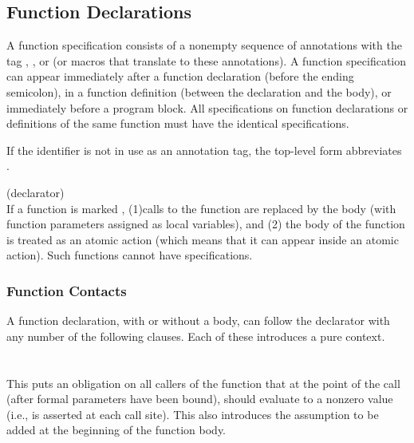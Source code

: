 \documentclass[preprint,nocopyrightspace]{sigplanconf}
\begin{document}
{{{\subsection{Function Declarations}
A function specification consists of a nonempty sequence of
annotations with the tag , ,
or  (or macros that translate to these annotations). A
function specification can appear immediately after a function
declaration (before the ending semicolon), in a function definition
(between the declaration and the body), or immediately before a
program block. All specifications on function declarations or
definitions of the same function must have the identical
specifications.

If the identifier  is not in use as an annotation tag, the
top-level form  abbreviates .

 (declarator)\\
If a function is marked , (1)calls to the
function are replaced by the body (with function parameters assigned
as local variables), and (2) the body of the function is treated as an
atomic action (which means that it can appear inside an atomic
action). Such functions cannot have specifications.

\subsubsection{Function Contacts}
A function declaration, with or without a body, can follow the
declarator with any number of the following clauses. Each of these
introduces a pure context.
\\\\
\\
This puts  an obligation on  all callers of  the function that  at the
point of the  call (after formal parameters have  been bound), 
should evaluate to a nonzero  value (i.e.,  is asserted at each
call site). This also introduces  the assumption to be added at
the beginning of the function body. 

}}}
\end{document}

